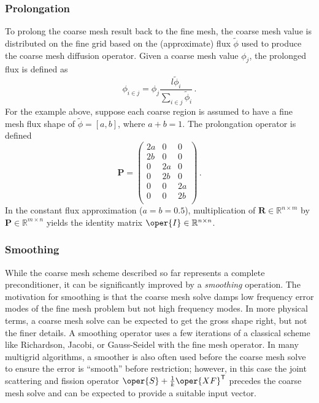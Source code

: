 \subsubsection{Prolongation}

To prolong the coarse mesh result back to the fine mesh, the coarse mesh 
value is distributed on the fine grid based on the (approximate) 
flux $\tilde{\phi}$ used to produce the coarse mesh diffusion operator.  
Given a coarse mesh value $\phi_j$, the prolonged flux is defined as 
\begin{equation}
 \phi_{i \in j} =   \phi_j   \frac{l\tilde{\phi}_i}
                                  {\sum_{i \in j} \tilde{\phi}_i} \, .
\end{equation}
For the example above, suppose each coarse region is assumed to have 
a fine mesh flux shape of $\tilde{\phi} = [a, b]$, where $a + b = 1$.  The 
prolongation operator is defined 
\begin{equation}
  \bm{P} = 
           \left(
           \begin{array}{ccc}
                2 a  &  0      &  0     \\
                2 b  &  0      &  0     \\
                  0  &  2 a    &  0     \\
                  0  &  2 b    &  0     \\
                  0  &  0      &  2 a \\
                  0  &  0      &  2 b \\
           \end{array} 
           \right ) \, .
\end{equation}
In the constant flux approximation ($a = b = 0.5$), multiplication 
of $\bm{R} \in \mathbb{R}^{n\times m}$ by  
$\bm{P} \in \mathbb{R}^{m\times n}$ yields the identity matrix 
$\oper{I} \in \mathbb{R}^{n\times n}$.


\subsubsection{Smoothing}

While the coarse mesh scheme described so far represents a complete 
preconditioner, it can be significantly improved by a \emph{ smoothing} 
operation.  The motivation for smoothing is that the coarse mesh solve damps 
low frequency error modes of the fine 
mesh problem but not high frequency modes.  In more physical terms, a 
coarse mesh solve can be expected to get the gross shape right, but 
not the finer details.  A smoothing operator uses a few iterations of 
a classical scheme like Richardson, Jacobi, or Gauss-Seidel with the fine 
mesh operator.  In many multigrid algorithms, a smoother is also often 
used before the coarse mesh solve to ensure the error is ``smooth'' 
before restriction; however, in this case the joint scattering and 
fission operator $\oper{S}+\frac{1}{k} \oper{XF}^{\transp}$ precedes 
the coarse mesh solve and can be expected to provide a suitable input vector.

